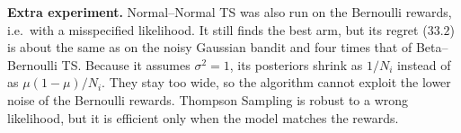 \documentclass[12pt,a4paper]{article}
\begin{document}
\textbf{Extra experiment.} Normal--Normal TS was also run on the Bernoulli rewards, i.e.\ with a misspecified likelihood.
It still finds the best arm, but its regret ($33.2$) is about the same as on the noisy Gaussian bandit and four times that of Beta--Bernoulli TS.
Because it assumes $\sigma^2 = 1$, its posteriors shrink as $1/N_i$ instead of as $\mu(1-\mu)/N_i$.
They stay too wide, so the algorithm cannot exploit the lower noise of the Bernoulli rewards.
Thompson Sampling is robust to a wrong likelihood, but it is efficient only when the model matches the rewards.
\end{document}
